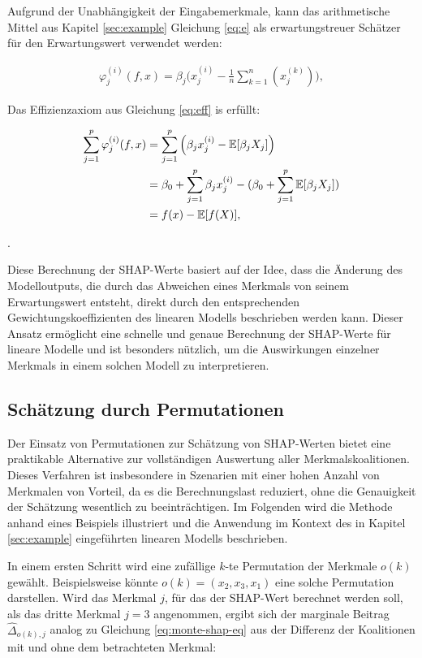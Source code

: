 Aufgrund der Unabhängigkeit der Eingabemerkmale, kann das arithmetische Mittel aus Kapitel 
\ref{sec:example} Gleichung \ref{eq:e} als erwartungstreuer Schätzer für den Erwartungswert verwendet werden:

\begin{align}
    \varphi_j^{(i)}(f, x) = \beta_j \Big(x_j^{(i)} - \frac{1}{n} \sum_{k=1}^{n} (x_j^{(k)})\Big),
\end{align}

Das Effizienzaxiom aus Gleichung \ref{eq:eff} is erfüllt:

\begin{align}
    \sum_{j=1}^p \varphi_j^{(i)}(f, x) &= \sum_{j=1}^p  \Big( \beta_j x_j^{(i)} - \mathbb{E}[\beta_j X_j]\Big) \\ \notag
                                    &= \beta_0 + \sum_{j=1}^p \beta_j x_j^{(i)} - ( \beta_0 + \sum_{j=1}^p \mathbb{E}[\beta_j X_j]) \\ \notag
                                    &= f(x) - \mathbb{E}[f(X)],
\end{align}                 

\cite[S. 48]{Molnar_2023}.

Diese Berechnung der SHAP-Werte basiert auf der Idee, dass die Änderung 
des Modelloutputs, die durch das Abweichen eines Merkmals von seinem 
Erwartungswert entsteht, direkt durch den entsprechenden Gewichtungskoeffizienten 
des linearen Modells beschrieben werden kann. Dieser Ansatz ermöglicht eine 
schnelle und genaue Berechnung der SHAP-Werte für lineare Modelle und ist 
besonders nützlich, um die Auswirkungen einzelner Merkmals in einem solchen 
Modell zu interpretieren. 

\subsection{Schätzung durch Permutationen}
\label{subsec:permutation}

Der Einsatz von Permutationen zur Schätzung von SHAP-Werten bietet eine 
praktikable Alternative zur vollständigen Auswertung aller Merkmalskoalitionen. 
Dieses Verfahren ist insbesondere in Szenarien mit einer hohen Anzahl von Merkmalen von Vorteil, 
da es die Berechnungslast reduziert, ohne die Genauigkeit der Schätzung wesentlich zu beeinträchtigen. 
Im Folgenden wird die Methode anhand eines Beispiels illustriert und die Anwendung im Kontext des in 
Kapitel \ref{sec:example} eingeführten linearen Modells beschrieben.

In einem ersten Schritt wird eine zufällige $k$-te Permutation der Merkmale $o(k)$ gewählt.
Beispielsweise könnte $o(k) = (x_2, x_3, x_1)$ eine solche Permutation darstellen.
Wird das Merkmal $j$, für das der SHAP-Wert berechnet werden soll, als das dritte Merkmal $j=3$ angenommen, 
ergibt sich der marginale Beitrag $\hat{\Delta}_{o(k), j}$ analog zu Gleichung \ref{eq:monte-shap-eq} aus der Differenz
der Koalitionen mit und ohne dem betrachteten Merkmal:

